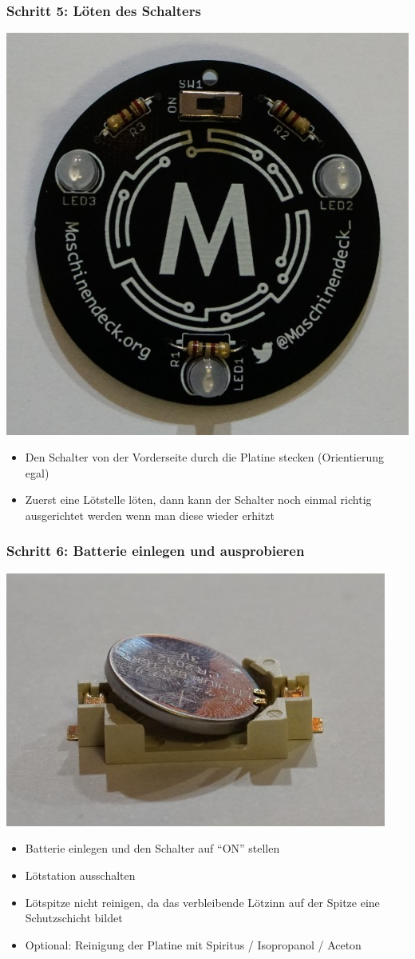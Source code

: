 \documentclass[10pt]{beamer}
\begin{document}
	\begin{frame}
		\frametitle{Schritt 5: Löten des Schalters}
		\centering \includegraphics[width=.4\linewidth]{images/step5.png}
		\begin{itemize} 
			\item{Den Schalter von der Vorderseite durch die Platine stecken (Orientierung egal)}
			\item{Zuerst eine Lötstelle löten, dann kann der Schalter noch einmal richtig ausgerichtet werden wenn man diese wieder erhitzt}
		\end{itemize}
	\end{frame}

	\begin{frame}
		\frametitle{Schritt 6: Batterie einlegen und ausprobieren}
		\centering \includegraphics[width=.4\linewidth]{images/step6.png}
		\begin{itemize} 
			\item{Batterie einlegen und den Schalter auf ``ON'' stellen}
			\item{Lötstation ausschalten}
			\item{Lötspitze nicht reinigen, da das verbleibende Lötzinn auf der Spitze eine Schutzschicht bildet}
			\item{Optional: Reinigung der Platine mit Spiritus / Isopropanol / Aceton}
		\end{itemize}
	\end{frame}
\end{document}
